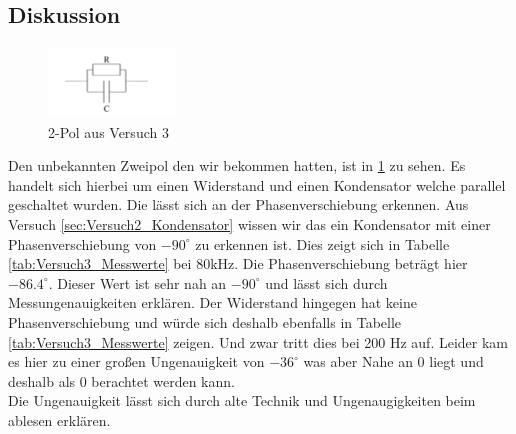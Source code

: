     \subsection{Diskussion}
    \begin{figure}[H]
        \centering
                \includegraphics[width=0.3\textwidth]{bilder/2pol.png}
                \caption{2-Pol aus Versuch 3}
                \label{fig:2pol}
    \end{figure}
    Den unbekannten Zweipol den wir bekommen hatten, ist in \ref{fig:2pol} zu sehen. Es handelt sich hierbei um einen Widerstand und einen Kondensator welche parallel geschaltet wurden. Die lässt sich an der Phasenverschiebung erkennen. Aus Versuch \ref{sec:Versuch2_Kondensator} wissen wir das ein Kondensator mit einer Phasenverschiebung von $-90^{\circ}$ zu erkennen ist. Dies zeigt sich in Tabelle \ref{tab:Versuch3_Messwerte} bei 80kHz. Die Phasenverschiebung beträgt hier $-86.4^{\circ}$. Dieser Wert ist sehr nah an $-90^{\circ}$ und lässt sich durch Messungenauigkeiten erklären. Der Widerstand hingegen hat keine Phasenverschiebung und würde sich deshalb ebenfalls in Tabelle \ref{tab:Versuch3_Messwerte} zeigen. Und zwar tritt dies bei 200 Hz auf. Leider kam es hier zu einer großen Ungenauigkeit von $-36^{\circ}$ was aber Nahe an 0 liegt und deshalb als 0 berachtet werden kann.\\

    \noindent Die Ungenauigkeit lässt sich durch alte Technik und Ungenaugigkeiten beim ablesen erklären. 